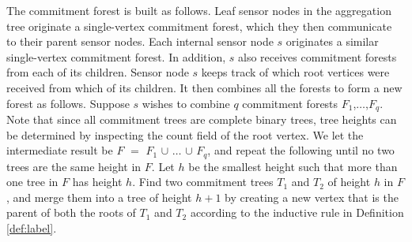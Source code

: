 			The commitment forest is built as follows. Leaf sensor nodes in the aggregation tree originate a single-vertex commitment forest, which they then communicate to their parent sensor nodes. Each internal sensor node $s$ originates a similar single-vertex commitment forest.
			In addition, $s$ also receives commitment forests from each of its children.
			Sensor node $s$ keeps track of which root vertices were received from which of its children.
			It then combines all the forests to form a new forest as follows.
			Suppose $s$ wishes to combine $q$ commitment forests $F_{1}$,$\dotsc$,$F_{q}$.
			Note that since all commitment trees are complete binary trees, tree heights can be determined by inspecting the count field of the	root vertex.
			We let the intermediate result be $F$ $=$ $F_{1}$ $\cup$ $\dotsc$ $\cup$ $F_{q}$, and repeat the following until no two trees are the same height in $F$.
			Let $h$ be the smallest height such that more than one tree in $F$ has height $h$.
			Find two commitment trees $T_{1}$ and $T_{2}$ of height $h$ in $F$, and merge them into a tree of height $h + 1$ by creating a new vertex that is the parent of both the roots of $T_{1}$ and $T_{2}$ according to the inductive rule in Definition \ref{def:label}.

